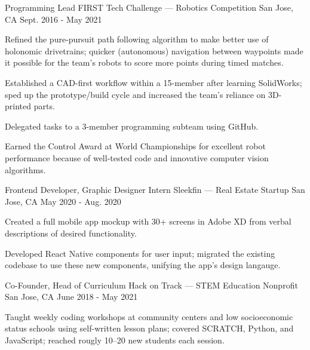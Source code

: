 
\begin{cventries}
  \cventry
  {Programming Lead} %
  {FIRST Tech Challenge --- Robotics Competition} %
  {San Jose, CA} %
  {Sept. 2016 - May 2021} %
  {
    \begin{cvitems} %
      \item {Refined the pure-pursuit path following algorithm to make better use of holonomic drivetrains; quicker (autonomous) navigation between waypoints made it possible for the team's robots to score more points during timed matches.}
      \item {Established a CAD-first workflow within a 15-member after learning SolidWorks; sped up the prototype/build cycle and increased the team's reliance on 3D-printed parts.}
      \item {Delegated tasks to a 3-member programming subteam using GitHub.}
      \item {Earned the Control Award at World Championships for excellent robot performance because of well-tested code and innovative computer vision algorithms.}
    \end{cvitems}
  }

  \cventry
  {Frontend Developer, Graphic Designer Intern} %
  {Sleekfin --- Real Estate Startup} %
  {San Jose, CA} %
  {May 2020 - Aug. 2020} %
  {
    \begin{cvitems} %
      \item {Created a full mobile app mockup with 30+ screens in Adobe XD from verbal descriptions of desired functionality.}
      \item {Developed React Native components for user input; migrated the existing codebase to use these new components, unifying the app's design langauge.}
    \end{cvitems}
  }

  \cventry
  {Co-Founder, Head of Curriculum} %
  {Hack on Track --- STEM Education Nonprofit} %
  {San Jose, CA} %
  {June 2018 - May 2021} %
  {
    \begin{cvitems} %
      \item {Taught weekly coding workshops at community centers and low socioeconomic status schools using self-written lesson plans; covered SCRATCH, Python, and JavaScript; reached rougly 10--20 new students each session.}
    \end{cvitems}
  }
\end{cventries}
